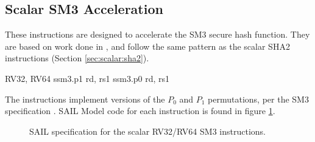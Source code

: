 
\newpage
\subsection{Scalar SM3 Acceleration}
\label{sec:scalar:sm3}

These instructions are designed to accelerate the SM3 secure
hash function\cite{ietf:sm3}.
They are based on work done in \cite{MJS:LWSHA:20}, and follow
the same pattern as the scalar SHA2 instructions
(Section \ref{sec:scalar:sha2}).

\begin{cryptoisa}
RV32, RV64
    ssm3.p1 rd, rs1
    ssm3.p0 rd, rs1
\end{cryptoisa}

The instructions implement versions of the $P_0$ and $P_1$
permutations, per the SM3 specification \cite{ietf:sm3}.
SAIL Model code for each instruction is found in figure
\ref{fig:sail:sm3}.

\begin{figure}[h]

\caption{SAIL specification for the scalar RV32/RV64 SM3 instructions.}
\label{fig:sail:sm3}
\end{figure}
